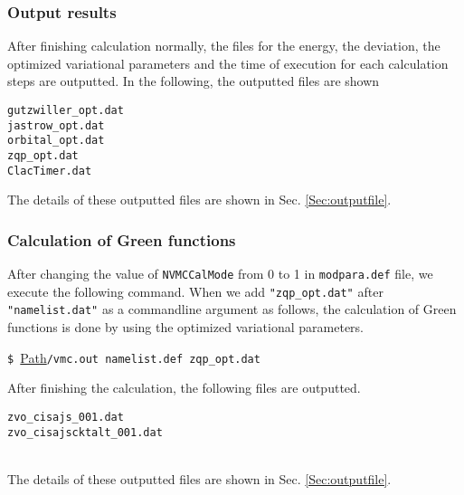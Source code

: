 \subsubsection{Output results}
After finishing calculation normally, the files for the energy, the deviation, the optimized variational parameters and the time of execution for each calculation steps are outputted. In the following, the outputted files are shown \\
\begin{minipage}{12cm}
\begin{screen}
\begin{verbatim}
gutzwiller_opt.dat
jastrow_opt.dat
orbital_opt.dat
zqp_opt.dat
ClacTimer.dat
\end{verbatim}
\end{screen}
\end{minipage}

The details of these outputted files are shown in Sec. \ref{Sec:outputfile}.\\

\subsubsection{Calculation of Green functions}
After changing the value of \verb|NVMCCalMode| from 0 to 1 in \verb|modpara.def| file, we execute the following command. 
When we add \verb|"zqp_opt.dat"| after \verb|"namelist.dat"| as a commandline argument
as follows,
the calculation of Green functions is done by using the optimized variational parameters. 

\vspace{1cm}\hspace{-0.7cm}
\verb|$ |\underline{Path}\verb|/vmc.out namelist.def zqp_opt.dat|
\small

After finishing the calculation, the following files are outputted.
\\
\begin{minipage}{12cm}
\begin{screen}
\begin{verbatim}
zvo_cisajs_001.dat
zvo_cisajscktalt_001.dat
\end{verbatim}
\end{screen}
\end{minipage}
\\
The details of these outputted files are shown in Sec. \ref{Sec:outputfile}.\\

